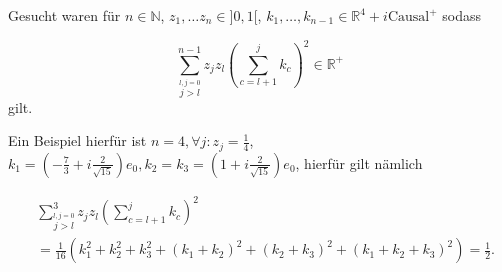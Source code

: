 \documentclass[a4paper,12pt]{article}
\begin{document}
Gesucht waren für \(n \in \mathbb{N}\), \(z_1,\dots z_n\in ]0,1[ \), 
\(k_1, \dots, k_{n-1}\in \mathbb{R}^4+i \text{Causal}^+\) sodass

\begin{equation}
\sum_{\stackrel{l,j=0}{j>l}}^{n-1} z_j z_l \left( \sum_{c=l+1}^j k_c \right)^2\in \mathbb{R}^+
\end{equation}
gilt.

Ein Beispiel hierfür ist \(n=4, \forall j: z_j=\frac{1}{4}\), \(k_1=\left( -\frac{7}{3} + i \frac{2}{\sqrt{15}}\right) e_0, k_2=k_3=\left(1+i \frac{2}{\sqrt{15}}\right) e_0\), hierfür gilt nämlich

\begin{align}
&\sum_{\stackrel{l,j=0}{j>l}}^{3} z_j z_l \left( \sum_{c=l+1}^j k_c \right)^2\\
&=\frac{1}{16} \left(k_1^2 + k_2^2 + k_3^2 + (k_1+k_2)^2 + (k_2+k_3)^2 + (k_1+k_2+k_3)^2 \right)= \frac{1}{2}.
\end{align}
\end{document}
